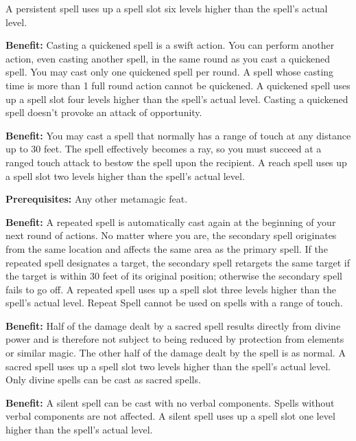 A persistent spell uses up a spell slot six levels higher than the spell's actual 
level.


\textbf{Benefit:} Casting a quickened spell is a swift action. You can perform another 
action, even casting another spell, in the same round as you cast a quickened spell. 
You may cast only one quickened spell per round. A spell whose casting time is 
more than 1 full round action cannot be quickened. A quickened spell uses up a 
spell slot four levels higher than the spell's actual level. Casting a quickened 
spell doesn't provoke an attack of opportunity.


\textbf{Benefit:} You may cast a spell that normally has a range of touch at any 
distance up to 30 feet. The spell effectively becomes a ray, so you must succeed 
at a ranged touch attack to bestow the spell upon the recipient. A reach spell 
uses up a spell slot two levels higher than the spell's actual level.


\textbf{Prerequisites:} Any other metamagic feat.

\textbf{Benefit:} A repeated spell is automatically cast again at the beginning 
of your next round of actions. No matter where you are, the secondary spell originates 
from the same location and affects the same area as the primary spell. If the repeated 
spell designates a target, the secondary spell retargets the same target if the target 
is within 30 feet of its original position; otherwise the secondary spell fails 
to go off. A repeated spell uses up a spell slot three levels higher than the spell's 
actual level. Repeat Spell cannot be used on spells with a range of touch.


\textbf{Benefit:} Half of the damage dealt by a sacred spell results directly from 
divine power and is therefore not subject to being reduced by protection from elements 
or similar magic. The other half of the damage dealt by the spell is as normal. 
A sacred spell uses up a spell slot two levels higher than the spell's actual level. 
Only divine spells can be cast as sacred spells.


\textbf{Benefit:} A silent spell can be cast with no verbal components. Spells 
without verbal components are not affected. A silent spell uses up a spell slot 
one level higher than the spell's actual level.

